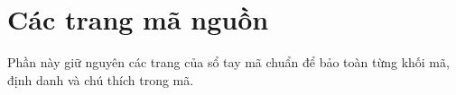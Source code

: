 \documentclass[11pt]{article}
\newcommand{\OriginalPDF}{\detokenize{../模板 TEMPLATES/上海交通大学ACM模板.pdf}}
\begin{document}
\clearpage
\section{Các trang mã nguồn}

\noindent Phần này giữ nguyên các trang của sổ tay mã chuẩn để bảo toàn từng khối mã, định danh và chú thích trong mã.


\end{document}
